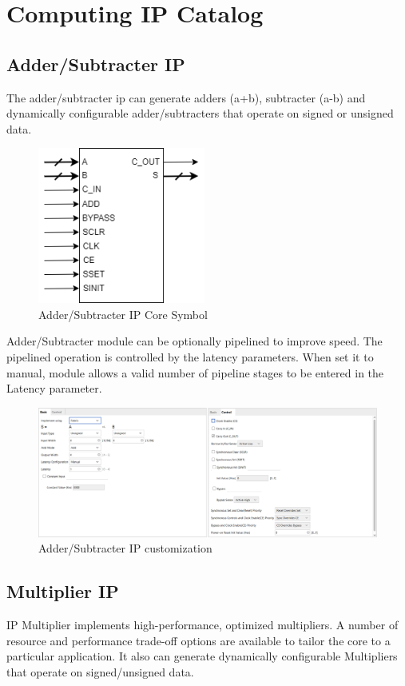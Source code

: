 \documentclass[a4paper, 12pt]{report}
\begin{document}
\section{Computing IP Catalog}
\subsection{Adder/Subtracter IP}
The adder/subtracter ip can generate adders (a+b), subtracter (a-b) and
dynamically configurable adder/subtracters that operate on signed or unsigned data.
\begin{figure}[H]
    \centering
    \includegraphics[width = 5.5cm]{picture/IP Catalog/add/Core_symbol.png}
    \caption{Adder/Subtracter IP Core Symbol}
    \medskip
\end{figure}

Adder/Subtracter module can be optionally pipelined to improve speed. The pipelined operation is controlled by the latency parameters. When set it to manual, module allows a valid number of pipeline stages to be entered in the Latency parameter.

\begin{figure}[H]
    \centering
    \includegraphics[width = 15cm]{picture/IP Catalog/add/ipaddcustom.png}
    \caption{Adder/Subtracter IP customization}
    \medskip
\end{figure}

\subsection{Multiplier IP}
IP Multiplier implements high-performance, optimized multipliers. A number of resource and performance trade-off options are available to tailor the core to a particular application. It also can generate dynamically configurable Multipliers that operate on signed/unsigned data.
\end{document}
